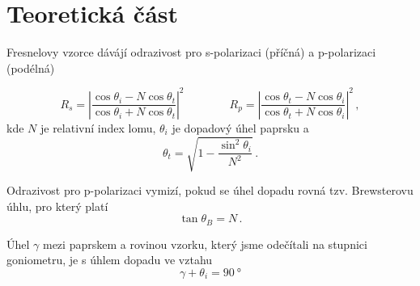 \section*{Teoretická část}
Fresnelovy vzorce dávájí odrazivost pro s-polarizaci (příčná) a p-polarizaci (podélná) \cite{maly}

\begin{equation} \label{e:fresnely}
R_s=\left| \frac{\cos\theta_i-N\cos\theta_t}{\cos\theta_i+N\cos\theta_t}\right|^2 \qquad \qquad R_p=\left| \frac{\cos\theta_t-N\cos\theta_i}{\cos\theta_t+N\cos\theta_i}\right|^2 \,,
\end{equation}
kde $N$ je relativní index lomu, $\theta_i$ je dopadový úhel paprsku a
\begin{equation*}
\theta_t=\sqrt{1-\frac{\sin^2\theta_i}{N^2}} \,.
\end{equation*}

Odrazivost pro p-polarizaci vymizí, pokud se úhel dopadu rovná tzv. Brewsterovu úhlu, pro který platí
\begin{equation} \label{e:brewster}
\tan\theta_B = N \,.
\end{equation}

Úhel $\gamma$ mezi paprskem a rovinou vzorku, který jsme odečítali na stupnici goniometru, je s úhlem dopadu ve vztahu
\begin{equation*}
\gamma + \theta_i = \SI{90}{\degree}
\end{equation*}

